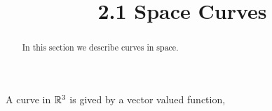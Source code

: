 \documentclass[handout]{ximera}
\title{2.1 Space Curves}
\begin{document}
\begin{abstract}
In this section we describe curves in space.
\end{abstract}
 
\maketitle





A curve in $\mathbb R^3$ is gived by a vector valued function,
\end{document}
